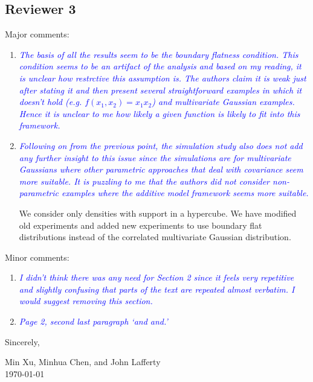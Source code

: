 \documentclass[pdftex,12pt]{article}
\def\rc#1{{\it\textcolor{blue}{#1}}\smallskip}
\begin{document}
\subsection*{Reviewer 3}


Major comments:

\begin{enumerate}
\item \rc{The basis of all the results seem to be the boundary flatness
condition. This condition seems to be an artifact of the analysis and
based on my reading, it is unclear how restrctive this assumption
is. The authors claim it is weak just after stating it and then
present several straightforward examples in which it doesn't hold
(e.g. $f(x_1,x_2)=x_1 x_2$) and multivariate Gaussian examples. Hence it is unclear to me how
likely a given function is likely to fit into this framework.}

\item \rc{Following on from the previous point, the simulation study also does
not add any further insight to this issue since the simulations are
for multivariate Gaussians where other parametric approaches that deal
with covariance seem more suitable. It is puzzling to me that the
authors did not consider non-parametric examples where the additive
model framework seems more suitable.}

We consider only densities with support in a hypercube. We have modified old experiments and added new experiments to use boundary flat distributions instead of the correlated multivariate Gaussian distribution. 


\end{enumerate}

Minor comments:

\begin{enumerate}
\item \rc{I didn't think there was any need for Section 2
  since it feels very repetitive and slightly confusing that parts of
  the text are repeated almost verbatim. I would suggest removing this section.}

\item \rc{Page 2, second last paragraph `and and.'}
\end{enumerate}


\vspace*{10pt}

Sincerely, 


Min Xu, Minhua Chen, and John Lafferty\\[1pt]
\today{}


\end{document}
